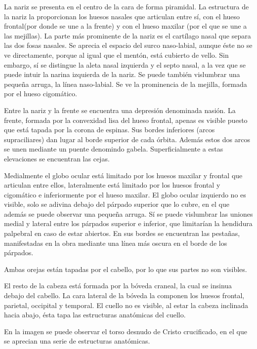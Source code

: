 La nariz se presenta en el centro de la cara de forma piramidal. La estructura de la nariz la proporcionan los huesos nasales que articulan entre sí, con el hueso frontal(por donde se une a la frente) y con el hueso maxilar (por el que se une  a las mejillas). La parte más prominente de la nariz es el cartílago nasal que separa las dos fosas nasales. Se aprecia el espacio del surco naso-labial, aunque éste no se ve directamente, porque al igual que el mentón, está cubierto de vello. Sin embargo, sí se distingue la aleta nasal izquierda y el septo nasal, a la vez que se puede intuir la narina izquierda de la nariz. Se puede también vislumbrar una pequeña arruga, la línea naso-labial. Se ve la prominencia de la mejilla, formada por el hueso cigomático. 

Entre la nariz y la frente se encuentra una depresión denominada nasión. La frente, formada por la convexidad lisa del hueso frontal, apenas es visible puesto que está tapada por la corona de espinas. Sus bordes inferiores (arcos supraciliares) dan lugar al borde superior de cada órbita. Además estos dos arcos se unen mediante un puente denomindo gabela. Superficialmente a estas elevaciones se encuentran las cejas.

Medialmente el globo ocular está limitado por los huesos maxilar y frontal que articulan entre ellos, lateralmente está limitado por los huesos frontal y cigomático e inferiormente por el hueso maxilar. El globo ocular izquierdo no es visible, solo se adivina debajo del párpado superior que lo cubre, en el que además se puede observar una pequeña arruga. Sí se puede vislumbrar las uniones medial y lateral entre los párpados superior e inferior, que limitarían la hendidura palpebral en caso de estar abiertos. En sus bordes se encuentran las pestañas, manifestadas en la obra mediante una línea más oscura en el borde de los párpados.

Ambas orejas están tapadas por el cabello, por lo que sus partes no son visibles.

El resto de la cabeza está formada por la bóveda craneal, la cual se insinua debajo del cabello. La cara lateral de la bóveda la componen los huesos frontal, parietal, occipital y temporal.
El cuello no es visible, al estar la cabeza inclinada hacia abajo, ésta tapa las estructuras anatómicas del cuello.

\vspace{12pt}

En la imagen se puede observar el torso desnudo de Cristo crucificado, en el que se aprecian una serie de estructuras anatómicas. 


